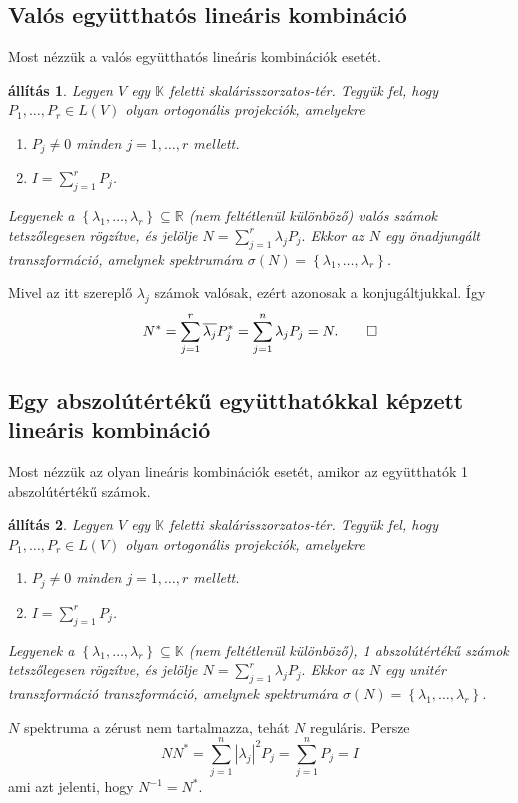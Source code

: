 \documentclass[a4paper, showtrims]{memoir}
\makeatletter
\renewenvironment{proof}[1][\proofname]
    {\par\pushQED{\qed}%
    \normalfont \topsep6\p@\@plus6\p@\relax
    \trivlist
    \item[\hskip\labelsep
        \itshape
    #1\@addpunct{:}]\ignorespaces}
    {\popQED\endtrivlist\@endpefalse}
\theoremstyle{plain}
\newtheorem{proposition}{állítás}[chapter]
\theoremstyle{remark}
\theoremstyle{definition}
\makeatother
\begin{document}
\subsection{Valós együtthatós lineáris kombináció}
Most nézzük a valós együtthatós lineáris kombinációk esetét.
\begin{proposition}\label{pr:normlinkombvalos}
	Legyen $V$ egy $\mathbb{K}$ feletti skalárisszorzatos-tér.
	Tegyük fel, hogy $P_1,\ldots,P_r\in L\left( V \right)$ olyan ortogonális projekciók,
	amelyekre
	\begin{enumerate}
		\item $P_j\neq 0$ minden $j=1,\ldots,r$ mellett.
		\item $I=\sum_{j=1}^rP_j$.
	\end{enumerate}
	Legyenek a $\left\{ \lambda_1,\ldots,\lambda_r \right\}\subseteq \mathbb{R}$
	(nem feltétlenül különböző) valós számok tetszőlegesen rögzítve,
	és jelölje
	\(
	N
	=
	\sum_{j=1}^r\lambda_jP_j.
	\)
	Ekkor az $N$ egy \emph{önadjungált} transzformáció,
	amelynek spektrumára $\sigma\left( N \right)=\left\{ \lambda_1,\ldots,\lambda_r \right\}$.
\end{proposition}
\begin{proof}
	Mivel az itt szereplő $\lambda_j$ számok valósak,
	ezért azonosak a konjugáltjukkal.
	Így
	\begin{displaymath}
		N^\ast=
		\sum_{j=1}^r\overline{\lambda_j}P_j^\ast
		=
		\sum_{j=1}^n\lambda_jP_j
		=N.
		\qedhere
	\end{displaymath}
\end{proof}

\subsection{Egy abszolútértékű együtthatókkal képzett lineáris kombináció}
Most nézzük az olyan lineáris kombinációk esetét, amikor az együtthatók 1 abszolútértékű számok.
\begin{proposition}\label{pr:normlinkombegys}
	Legyen $V$ egy $\mathbb{K}$ feletti skalárisszorzatos-tér.
	Tegyük fel, hogy $P_1,\ldots,P_r\in L\left( V \right)$ olyan ortogonális projekciók,
	amelyekre
	\begin{enumerate}
		\item $P_j\neq 0$ minden $j=1,\ldots,r$ mellett.
		\item $I=\sum_{j=1}^rP_j$.
	\end{enumerate}
	Legyenek a $\left\{ \lambda_1,\ldots,\lambda_r \right\}\subseteq \mathbb{K}$
	(nem feltétlenül különböző),
	1 abszolútértékű számok tetszőlegesen rögzítve,
	és jelölje
	\(
	N
	=
	\sum_{j=1}^r\lambda_jP_j.
	\)
	Ekkor az $N$ egy \emph{unitér transzformáció} transzformáció,
	amelynek spektrumára $\sigma\left( N \right)=\left\{ \lambda_1,\ldots,\lambda_r \right\}$.
\end{proposition}
\begin{proof}
	$N$ spektruma a zérust nem tartalmazza, tehát $N$ reguláris.
	Persze $$NN^\ast=\sum_{j=1}^n|\lambda_j|^2P_j=\sum_{j=1}^nP_j=I$$ ami azt jelenti,
	hogy $N^{-1}=N^\ast$.
\end{proof}
\end{document}
